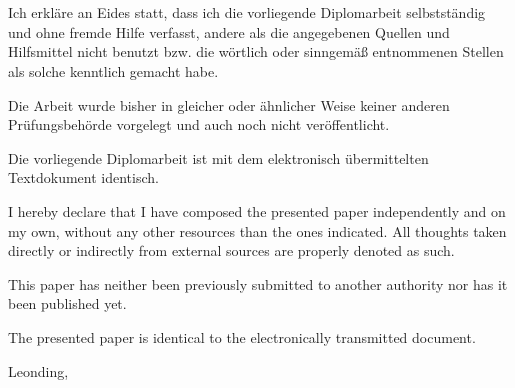 \thispagestyle{empty}
\vspace{3cm}
~ \\ \\
{
Ich erkläre an Eides statt, dass ich die vorliegende Diplomarbeit selbstständig und ohne fremde Hilfe verfasst, andere als die angegebenen Quellen und Hilfsmittel nicht benutzt bzw. die wörtlich oder sinngemä\ss{} entnommenen Stellen als solche kenntlich gemacht habe.

Die Arbeit wurde bisher in gleicher oder ähnlicher Weise keiner anderen Prüfungsbehörde vorgelegt und auch noch nicht veröffentlicht.

Die vorliegende Diplomarbeit ist mit dem elektronisch übermittelten Textdokument identisch.
}
{
I hereby declare that I have composed the presented paper independently and on my own, without any other resources than the ones indicated. 
All thoughts taken directly or indirectly from external sources are properly denoted as such.

This paper has neither been previously submitted to another authority nor has it been published yet.

The presented paper is identical to the electronically transmitted document.
}
\vspace{1cm}
Leonding, 
\vspace{3cm}
\begin{tabbing}
{\firstauthor}  \hspace{3.8cm}{\secondauthor}
\end{tabbing}
\vspace{10cm}
\newpage
\setcounter{page}{1}
